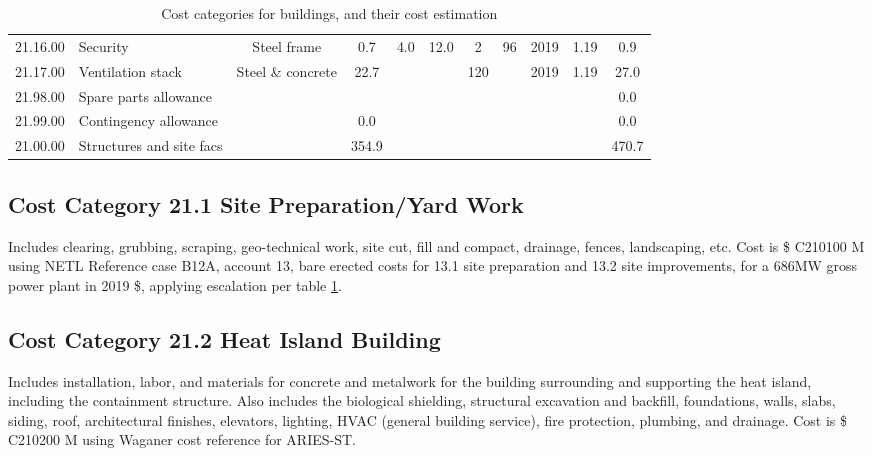 \begin{table}[ht!]
\begin{tiny}
\begin{tabular}{l l  c c c c c c c c c }
            21.16.00	&	Security	&	Steel frame	&	0.7	&	4.0	&	12.0	&	2	&	96	&	2019	&	1.19	&	0.9	\\
            21.17.00	&	Ventilation stack	&	Steel \& concrete 	&	22.7	&		&		&	120	&		&	2019	&	1.19	&	27.0	\\
            21.98.00	&	Spare parts allowance	&		&		&		&		&		&		&		&		&	0.0	\\
            21.99.00	&	Contingency allowance	&		&	0.0	&		&		&		&		&		&		&	0.0	\\
            21.00.00	&	Structures and site facs	&		&	354.9	&		&		&		&		&		&		&	470.7	\\
        \end{tabular}
    \end{tiny}
    \caption{Cost categories for buildings, and their cost estimation}
    \label{tab:buildings}
\end{table}











\subsection*{Cost Category 21.1 Site Preparation/Yard Work}
Includes clearing, grubbing, scraping, geo-technical work, site cut, fill and compact, drainage, fences, landscaping, etc.  Cost is \$ C210100 M using NETL Reference case B12A, account 13, bare erected costs for 13.1 site preparation and 13.2 site improvements, for a 686MW gross power plant in 2019 \$, applying escalation per table \ref{tab:buildings}.

\subsection*{Cost Category 21.2 Heat Island Building}
Includes installation, labor, and materials for concrete and metalwork for the building surrounding and supporting the heat island, including the containment structure. Also includes the biological shielding, structural excavation and backfill, foundations, walls, slabs, siding, roof, architectural finishes, elevators, lighting, HVAC (general building service), fire protection, plumbing, and drainage. Cost is \$ C210200 M using Waganer cost reference for ARIES-ST.


